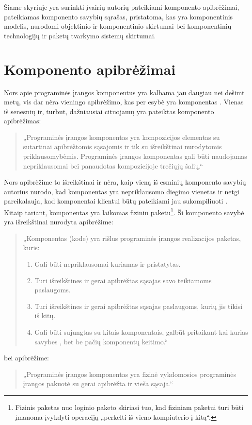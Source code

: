 
\label{chapter:component}

Šiame skyriuje yra surinkti įvairių autorių pateikiami komponento
apibrėžimai, pateikiamas komponento savybių sąrašas, pristatoma, kas
yra komponentinis modelis, nurodomi objektinio ir komponentinio
skirtumai bei komponentinių technologijų ir paketų tvarkymo sistemų
skirtumai.

\section{Komponento apibrėžimai}

\label{section:component:descriptions}

Nors apie programinės įrangos komponentus yra kalbama jau daugiau
nei dešimt metų, vis dar nėra vieningo apibrėžimo, kas per esybė
yra komponentas \cite{classification-framework-for-scm}. Vienas
iš senesnių ir, turbūt, dažniausiai cituojamų yra 
\cite[41]{cs-beyond-object-oriented-programming}
pateiktas komponento apibrėžimas:
\begin{quote}
  „Programinės įrangos komponentas yra kompozicijos elementas su
  sutartinai apibrėžtomis sąsajomis ir tik su išreikštinai
  nurodytomis priklausomybėmis. Programinės įrangos komponentas
  gali būti naudojamas nepriklausomai bei panaudotas
  kompozicijoje trečiųjų šalių.“
\end{quote}
Nors apibrėžime to išreikštinai ir nėra, kaip vieną iš
esminių komponento savybių autorius nurodo, kad komponentas yra
nepriklausomo diegimo vienetas 
\cite[36]{cs-beyond-object-oriented-programming} ir netgi
pareikalauja, kad komponentai klientui būtų pateikiami jau
sukompiliuoti \cite{point-counterpoint}. Kitaip tariant, komponentas
yra laikomas fiziniu paketu\footnote{Fizinis paketas nuo loginio paketo
skiriasi tuo, kad fiziniam paketui turi būti įmanoma įvykdyti
operaciją „perkelti iš vieno kompiuterio į kitą“.}. Ši
komponento savybė yra išreikštinai
nurodyta \cite[385]{objects-components-and-frameworks-with-uml}
apibrėžime:
\begin{quote}
  „Komponentas (kode) yra rišlus programinės įrangos realizacijos
  paketas, kuris:
  \begin{enumerate}
    \item Gali būti nepriklausomai kuriamas ir pristatytas.
    \item Turi išreikštines ir gerai apibrėžtas sąsajas savo teikiamoms
      paslaugoms.
    \item Turi išreikštines ir gerai apibrėžtas sąsajas paslaugoms,
      kurių jis tikisi iš kitų.
    \item Gali būti sujungtas su kitais komponentais, galbūt pritaikant
      kai kurias savybes , bet be pačių komponentų
      keitimo.“
  \end{enumerate}
\end{quote}
bei \cite[1]{Hopkins:2000:CP:352183.352198} apibrėžime:
\begin{quote}
  „Programinės įrangos komponentas yra fizinė vykdomosios programinės
  įrangos pakuotė su gerai apibrėžta ir vieša sąsaja.“
\end{quote}

